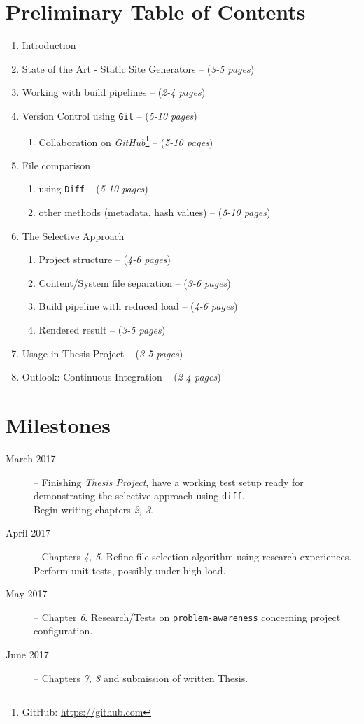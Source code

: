 \documentclass[a4paper,english,11pt]{article}
\begin{document}
\section{Preliminary Table of Contents}
\begin{enumerate}
\item Introduction
\item State of the Art - Static Site Generators -- (\emph{3-5 pages})
\item Working with build pipelines -- (\emph{2-4 pages})
\item Version Control using \texttt{Git} -- (\emph{5-10 pages})

\begin{enumerate}
\item Collaboration on \emph{GitHub}\footnote{GitHub: \url{https://github.com}} -- (\emph{5-10 pages})
\end{enumerate}
\item File comparison

\begin{enumerate}
\item using \texttt{Diff} -- (\emph{5-10 pages})
\item other methods (metadata, hash values) -- (\emph{5-10 pages})
\end{enumerate}
\item The Selective Approach

\begin{enumerate}
\item Project structure  -- (\emph{4-6 pages})
\item Content/System file separation -- (\emph{3-6 pages})
\item Build pipeline with reduced load -- (\emph{4-6 pages})
\item Rendered result -- (\emph{3-5 pages})
\end{enumerate}
\item Usage in Thesis Project -- (\emph{3-5 pages})
\item Outlook: Continuous Integration -- (\emph{2-4 pages})
\end{enumerate}

\section{Milestones}
\begin{description}
\item [March 2017] -- Finishing \emph{Thesis Project}, have a working test setup ready for demonstrating the selective approach using \texttt{diff}.\\
Begin writing chapters \emph{2, 3}.
\item [April 2017] -- Chapters \emph{4, 5}. Refine file selection algorithm using research experiences. Perform unit tests, possibly under high load.
\item [May 2017] -- Chapter \emph{6}. Research/Tests on \texttt{problem-awareness} concerning project configuration.
\item [June 2017] -- Chapters \emph{7, 8} and submission of written Thesis.
\end{description}
\end{document}
